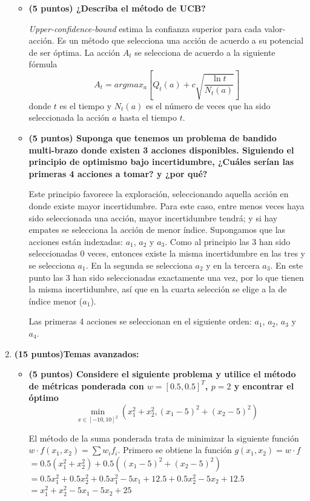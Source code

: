 \documentclass[a4paper,10pt]{article}
\begin{document}
\begin{enumerate}
\begin{itemize}
	\item \textbf{(5 puntos) ¿Describa el método de UCB?}
	
	\emph{Upper-confidence-bound} estima la confianza superior para cada valor-acción. Es un método que selecciona una acción de acuerdo a su potencial de ser óptima. La acción $A_t$ se selecciona de acuerdo a la siguiente fórmula \[A_t = argmax_a [Q_t(a) +c \sqrt{\frac{\ln t}{N_t(a)}}] \] donde $t$ es el tiempo y $N_t(a)$ es el número de veces que ha sido seleccionada la acción $a$ hasta el tiempo $t$.
	
	\item \textbf{(5 puntos) Suponga que tenemos un problema de bandido multi-brazo donde existen 3 acciones disponibles. Siguiendo el principio de optimismo bajo incertidumbre, ¿Cuáles serían las primeras 4 acciones a tomar? y ¿por qué?}
	
	Este principio favorece la exploración, seleccionando aquella acción en donde existe mayor incertidumbre. Para este caso, entre menos veces haya sido seleccionada una acción, mayor incertidumbre tendrá; y si hay empates se selecciona la acción de menor índice. Supongamos que las acciones están indexadas: $a_1$, $a_2$ y $a_3$. Como al principio las 3 han sido seleccionadas 0 veces, entonces existe la misma incertidumbre en las tres y se selecciona $a_1$. En la segunda se selecciona $a_2$ y en la tercera $a_3$. En este punto las 3 han sido seleccionadas exactamente una vez, por lo que tienen la misma incertidumbre, así que en la cuarta selección se elige a la de índice menor ($a_1$).
	
	Las primeras 4 acciones se seleccionan en el siguiente orden: $a_1$, $a_2$, $a_3$ y $a_4$.
	
    \end{itemize}

    \item \textbf{(15 puntos)Temas avanzados:}
    \begin{itemize}
	   \item \textbf{(5 puntos) Considere el siguiente problema y utilice el método de métricas ponderada con $w=[0.5,0.5]^T$, $p=2$ y encontrar el óptimo} $$\min_{x\in[-10,10]^2} (x_1^2+x_2^2, (x_1-5)^2+(x_2-5)^2)$$
	   
	   El método de la suma ponderada trata de minimizar la siguiente función $w \cdot f(x_1, x_2) = \sum w_i f_i$. Primero se obtiene la función $g(x_1, x_2) = w \cdot f$\\
	   $ = 0.5(x_1^2 + x_2^2) + 0.5((x_1-5)^2 + (x_2-5)^2)$\\
	   $ = 0.5x_1^2 + 0.5x_2^2 + 0.5x_1^2 - 5x_1+12.5+0.5x_2^2-5x_2+12.5$\\
	   $ = x_1^2 + x_2^2 - 5x_1 - 5x_2 + 25$
	   

\end{itemize}
\end{enumerate}
\end{document}
